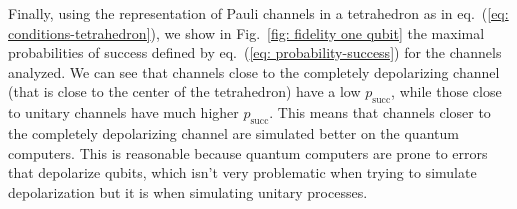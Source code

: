 \documentclass[10pt,letterpaper]{article} %
\renewcommand{\succ}{\textrm{succ}}
\newcommand{\fref}[1]{Fig.~\ref{#1}}
\newcommand{\eref}[1]{eq.~(\ref{#1})}
\begin{document}
Finally, using the representation of Pauli channels in a tetrahedron as
in \eref{eq: conditions-tetrahedron},
we show in \fref{fig: fidelity one qubit} the maximal probabilities of
success defined by \eref{eq: probability-success} for the channels
analyzed. 
We can see that channels close to the 
completely depolarizing
channel (that is close to the center of the tetrahedron)
have a low $p_{\succ}$, while those 
close to unitary channels have much higher $p_{\succ}$.
This means that channels closer to the 
completely depolarizing channel are simulated better on the quantum computers.
This is reasonable because quantum computers are prone to errors
that depolarize qubits, which isn't very problematic
when trying to simulate depolarization but it is 
when simulating unitary processes.
\end{document}
